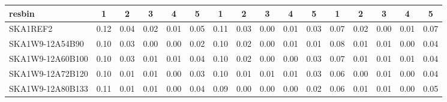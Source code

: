 \begin{table}[H]
{{\begin{tabular}{|lccccc||ccccc||ccccc|}
 resbin  &1 & 2 & 3 & 4 & 5 & 1 & 2 & 3 & 4 & 5 & 1 & 2 & 3 & 4 & 5 \\ \hline
SKA1REF2 & 0.12 \cellcolor{blue!60.00} & 0.04 \cellcolor{red!60.00} & 0.02 \cellcolor{green!60.00} & 0.01 \cellcolor{orange!60.00} & 0.05 \cellcolor{purple!60.00} & 0.11 \cellcolor{blue!60.00} & 0.03 \cellcolor{red!60.00} & 0.00 \cellcolor{green!18.00} & 0.01 \cellcolor{orange!60.00} & 0.03 \cellcolor{purple!60.00} & 0.07 \cellcolor{blue!39.00} & 0.02 \cellcolor{red!60.00} & 0.00 \cellcolor{green!18.00} & 0.01 \cellcolor{orange!60.00} & 0.07 \cellcolor{purple!60.00}\\ \hline 
SKA1W9-12A54B90 & 0.10 \cellcolor{blue!18.00} & 0.03 \cellcolor{red!46.00} & 0.00 \cellcolor{green!18.00} & 0.00 \cellcolor{orange!18.00} & 0.02 \cellcolor{purple!18.00} & 0.10 \cellcolor{blue!39.00} & 0.02 \cellcolor{red!46.00} & 0.00 \cellcolor{green!18.00} & 0.01 \cellcolor{orange!60.00} & 0.01 \cellcolor{purple!18.00} & 0.08 \cellcolor{blue!60.00} & 0.01 \cellcolor{red!39.00} & 0.01 \cellcolor{green!60.00} & 0.00 \cellcolor{orange!18.00} & 0.04 \cellcolor{purple!18.00}\\ \hline 
SKA1W9-12A60B100 & 0.10 \cellcolor{blue!18.00} & 0.03 \cellcolor{red!46.00} & 0.01 \cellcolor{green!39.00} & 0.01 \cellcolor{orange!60.00} & 0.04 \cellcolor{purple!46.00} & 0.10 \cellcolor{blue!39.00} & 0.02 \cellcolor{red!46.00} & 0.00 \cellcolor{green!18.00} & 0.00 \cellcolor{orange!18.00} & 0.03 \cellcolor{purple!60.00} & 0.07 \cellcolor{blue!39.00} & 0.01 \cellcolor{red!39.00} & 0.01 \cellcolor{green!60.00} & 0.01 \cellcolor{orange!60.00} & 0.04 \cellcolor{purple!18.00}\\ \hline 
SKA1W9-12A72B120 & 0.10 \cellcolor{blue!18.00} & 0.01 \cellcolor{red!18.00} & 0.01 \cellcolor{green!39.00} & 0.00 \cellcolor{orange!18.00} & 0.03 \cellcolor{purple!32.00} & 0.10 \cellcolor{blue!39.00} & 0.01 \cellcolor{red!32.00} & 0.01 \cellcolor{green!60.00} & 0.01 \cellcolor{orange!60.00} & 0.03 \cellcolor{purple!60.00} & 0.06 \cellcolor{blue!18.00} & 0.00 \cellcolor{red!18.00} & 0.01 \cellcolor{green!60.00} & 0.00 \cellcolor{orange!18.00} & 0.04 \cellcolor{purple!18.00}\\ \hline 
SKA1W9-12A80B133 & 0.11 \cellcolor{blue!39.00} & 0.01 \cellcolor{red!18.00} & 0.01 \cellcolor{green!39.00} & 0.00 \cellcolor{orange!18.00} & 0.04 \cellcolor{purple!46.00} & 0.09 \cellcolor{blue!18.00} & 0.00 \cellcolor{red!18.00} & 0.00 \cellcolor{green!18.00} & 0.00 \cellcolor{orange!18.00} & 0.02 \cellcolor{purple!39.00} & 0.06 \cellcolor{blue!18.00} & 0.01 \cellcolor{red!39.00} & 0.01 \cellcolor{green!60.00} & 0.00 \cellcolor{orange!18.00} & 0.05 \cellcolor{purple!32.00}\\ \hline 

\end{tabular}}}
\end{table}
